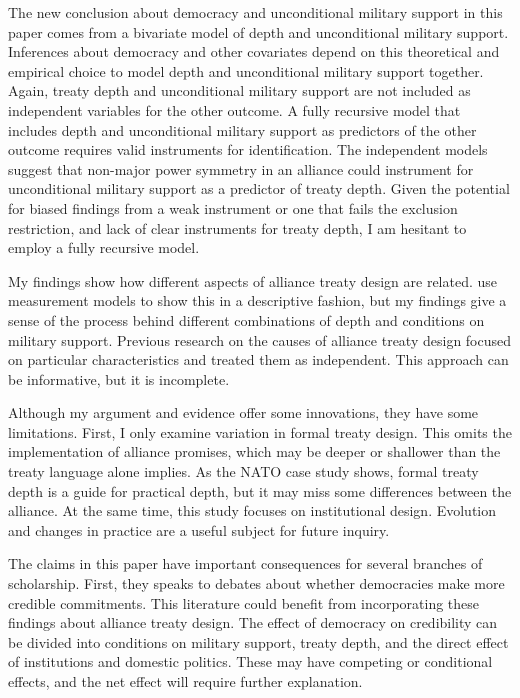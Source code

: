 \documentclass[12pt]{article}
\begin{document}
The new conclusion about democracy and unconditional military support in this paper comes from a bivariate model of depth and unconditional military support. 
Inferences about democracy and other covariates depend on this theoretical and empirical choice to model depth and unconditional military support together. 
Again, treaty depth and unconditional military support are not included as independent variables for the other outcome. 
A fully recursive model that includes depth and unconditional military support as predictors of the other outcome requires valid instruments for identification. 
The independent models suggest that non-major power symmetry in an alliance could instrument for unconditional military support as a predictor of treaty depth. 
Given the potential for biased findings from a weak instrument or one that fails the exclusion restriction, and lack of clear instruments for treaty depth, I am hesitant to employ a fully recursive model.  



My findings show how different aspects of alliance treaty design are related. 
\citet{BensonClinton2016} use measurement models to show this in a descriptive fashion, but my findings give a sense of the process behind different combinations of depth and conditions on military support. 
Previous research on the causes of alliance treaty design \citep{Benson2012, Mattes2012, Chibaetal2015} focused on particular characteristics and treated them as independent. 
This approach can be informative, but it is incomplete. 


Although my argument and evidence offer some innovations, they have some limitations. 
First, I only examine variation in formal treaty design. 
This omits the implementation of alliance promises, which may be deeper or shallower than the treaty language alone implies. 
As the NATO case study shows, formal treaty depth is a guide for practical depth, but it may miss some differences between the alliance. 
At the same time, this study focuses on institutional design. 
Evolution and changes in practice are a useful subject for future inquiry. 


The claims in this paper have important consequences for several branches of scholarship. 
First, they speaks to debates about whether democracies make more credible commitments. 
This literature could benefit from incorporating these findings about alliance treaty design. 
The effect of democracy on credibility can be divided into conditions on military support, treaty depth, and the direct effect of institutions and domestic politics. 
These may have competing or conditional effects, and the net effect will require further explanation. 
\end{document}
